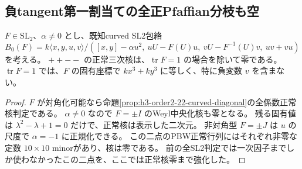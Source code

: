\subsection{負tangent第一割当ての全正Pfaffian分枝も空}
\label{subsec:h3-order2-22-tangent-plus-Ore}
\begin{lemma}[非零片側curvatureの強化された正常核]
\label{lem:h3-order2-22-curved-graded-zero}
$F\in\mathrm{SL}_2$、$\alpha\ne0$ とし、既知curved SL2包絡
\[
 B_0(F)=k\langle x,y,u,v\rangle/
 ([x,y]-\alpha u^2,\ uU-F(U)u,\ vU-F^{-1}(U)v,\ uv+vu)
\]
を考える。
$++--$ の正常三次核は、$\operatorname{tr}F=1$ の場合を除いて零である。
$\operatorname{tr}F=1$ では、$F$ の固有座標で $kx^3+ky^3$ に等しく、特に負変数 $v$ を含まない。
\end{lemma}
\begin{proof}
$F$ が対角化可能なら命題\ref{prop:h3-order2-22-curved-diagonal}の全係数正常核判定である。
$\alpha\ne0$ なので $F=\pm I$ のWeyl中央化核も零となる。
残る固有値は $\lambda^2-\lambda+1=0$ だけで、正常核は表示した二次元。
非対角型 $F=\pm J$ は $u$ の尺度で $\alpha=-1$ に正規化できる。
この二点のPBW正常行列にはそれぞれ非零な定数 $10\times10$ minorがあり、核は零である。
前の全SL2判定では一次因子までしか使わなかったこの二点を、ここでは正常核零まで強化した。
\end{proof}

